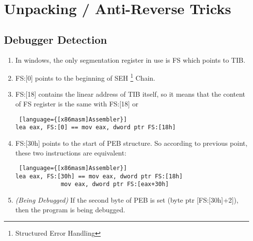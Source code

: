 \chapter{Unpacking / Anti-Reverse Tricks}
\section{Debugger Detection}
\begin{note}
\begin{enumerate}
\item In windows, the only segmentation register in use is FS which points to TIB.
\item FS:[0] points to the beginning of SEH \footnote{Structured Error Handling} Chain.
\item FS:[18] contains the linear address of TIB itself, so it means that the content of FS register is the same with FS:[18] or
\begin{lstlisting} [language={[x86masm]Assembler}]
lea eax, FS:[0] == mov eax, dword ptr FS:[18h]
\end{lstlisting}
\item FS:[30h] points to the start of PEB structure. So according to previous point, these two instructions are equivalent:
\begin{lstlisting} [language={[x86masm]Assembler}]
lea eax, FS:[30h] == mov eax, dword ptr FS:[18h]
		     mov eax, dword ptr FS:[eax+30h]
\end{lstlisting}
\item \textit{(Being Debugged)} If the second byte of PEB is set (byte ptr [FS:[30h]+2]), then the program is being debugged.
\end{enumerate}

\end{note}
